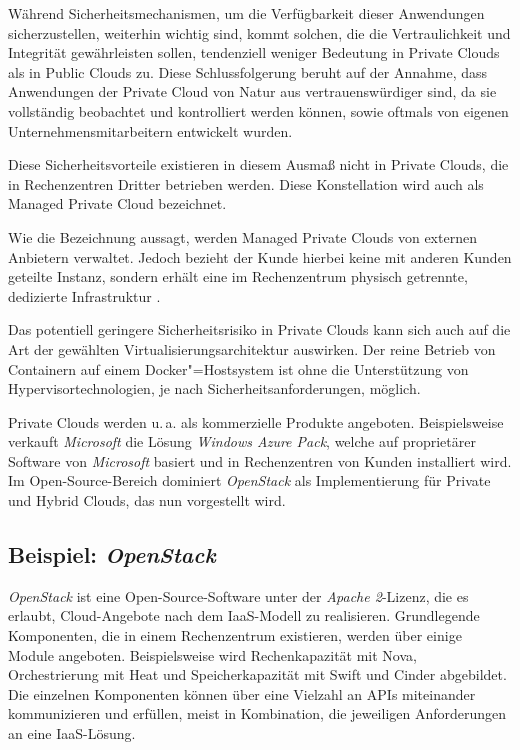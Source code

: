 \documentclass[../main.tex]{subfiles}
\begin{document}
    Während Sicherheitsmechanismen, um die Verfügbarkeit dieser Anwendungen sicherzustellen, weiterhin wichtig sind, kommt solchen, die die Vertraulichkeit und Integrität gewährleisten sollen, tendenziell weniger Bedeutung in Private Clouds als in Public Clouds zu. Diese Schlussfolgerung beruht auf der Annahme, dass Anwendungen der Private Cloud von Natur aus vertrauenswürdiger sind, da sie vollständig beobachtet und kontrolliert werden können, sowie oftmals von eigenen Unternehmensmitarbeitern entwickelt wurden.

    Diese Sicherheitsvorteile existieren in diesem Ausmaß nicht in Private Clouds, die in Rechenzentren Dritter betrieben werden. Diese Konstellation wird auch als Managed Private Cloud bezeichnet.

    Wie die Bezeichnung aussagt, werden Managed Private Clouds von externen Anbietern verwaltet. Jedoch bezieht der Kunde hierbei keine mit anderen Kunden geteilte Instanz, sondern erhält eine im Rechenzentrum physisch getrennte, dedizierte Infrastruktur \cite{softlayerPrivateCloud}.

    \clearpage

    Das potentiell geringere Sicherheitsrisiko in Private Clouds kann sich auch auf die Art der gewählten Virtualisierungsarchitektur auswirken. Der reine Betrieb von Containern auf einem Docker"=Hostsystem ist ohne die Unterstützung von Hypervisortechnologien, je nach Sicherheitsanforderungen, möglich.

    Private Clouds werden u.\,a. als kommerzielle Produkte angeboten. Beispielsweise verkauft \emph{Microsoft} die Lösung \emph{Windows Azure Pack}, welche auf proprietärer Software von \emph{Microsoft} basiert und in Rechenzentren von Kunden installiert wird. Im Open-Source-Bereich dominiert \emph{OpenStack} als Implementierung für Private und Hybrid Clouds, das nun vorgestellt wird.

    \subsection{Beispiel: \emph{OpenStack}}
      \emph{OpenStack} ist eine Open-Source-Software unter der \emph{Apache 2}-Lizenz, die es erlaubt, Cloud-Angebote nach dem IaaS-Modell zu realisieren. Grundlegende Komponenten, die in einem Rechenzentrum existieren, werden über einige Module angeboten. Beispielsweise wird Rechenkapazität mit Nova, Orchestrierung mit Heat und Speicherkapazität mit Swift und Cinder abgebildet. Die einzelnen Komponenten können über eine Vielzahl an APIs miteinander kommunizieren und erfüllen, meist in Kombination, die jeweiligen Anforderungen an eine IaaS-Lösung.
\end{document}
